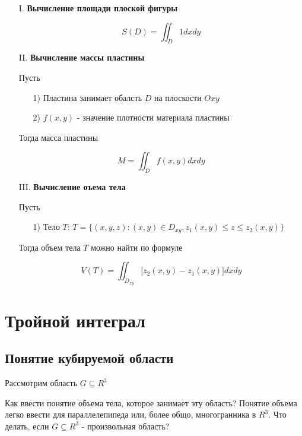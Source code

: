 \documentclass[a4paper, 14pt]{report}
\begin{document}
    \begin{enumerate}
        \item[I.] \textbf{Вычисление площади плоской фигуры}

        $$
            S(D) = \iint_D 1 dx dy
        $$

        \item[II.] \textbf{Вычисление массы пластины}

            Пусть 
            \begin{enumerate}
                \item[1)] Пластина занимает обалсть $D$ на плоскости $Oxy$
                \item[2)] $f(x,y)$ - значение плотности материала пластины
            \end{enumerate}

            Тогда масса пластины

            $$
            M = \iint_D f(x,y) dxdy
            $$

        \item[III.] \textbf{Вычисление оъема тела}

            Пусть

            \begin{enumerate}
                \item[1)] Тело $T$: $T = \{ (x,y,z): (x,y) \in D_{xy}, z_1(x,y) \le z \le z_2(x,y) \}$
            \end{enumerate}

            Тогда объем тела $T$ можно найти по формуле

            $$
            V(T) = \iint_{D_{xy}} \big[ z_2(x,y) - z_1(x,y) \big] dxdy
            $$

    \end{enumerate}

    \chapter{Тройной интеграл}

    \section{Понятие кубируемой области}

    Рассмотрим область $G \subseteq R^3$

    Как ввести понятие объема тела, которое занимает эту область? Понятие объема легко ввести для параллелепипеда или, более общо, многогранника в $R^3$. Что делать, если $G \subseteq R^3$ - произвольная область?
\end{document}
